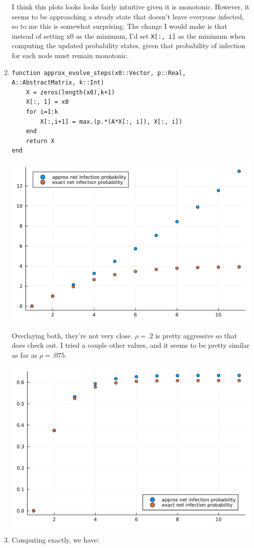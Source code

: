 \documentclass[]{exam}
\begin{document}
\begin{questions}
\begin{enumerate}[label=\arabic*.]
		I think this plots looks looks fairly intuitive given it is monotonic. However, it seems to be approaching a steady state that doesn't leave everyone infected, so to me this is somewhat surprising. The change I would make is that instead of setting x0 as the minimum, I'd set \texttt{X[:, i]} as the minimum when computing the updated probability states, given that probability of infection for each node must remain monotonic.
	\item
		\begin{lstlisting}
function approx_evolve_steps(x0::Vector, p::Real, A::AbstractMatrix, k::Int)
	X = zeros(length(x0),k+1)
	X[:, 1] = x0
	for i=1:k
		X[:,i+1] = max.(p.*(A*X[:, i]), X[:, i])
	end
	return X
end
		\end{lstlisting}
		\begin{center}
			\includegraphics[width=.7\textwidth]{code/q5-p5.png}
		\end{center}
		Overlaying both, they're not very close. $\rho = .2$ is pretty aggressive so that does check out.
		I tried a couple other values, and it seems to be pretty similar as far as $\rho = .075$. \\
		\begin{center}
			\includegraphics[width=.7\textwidth]{code/q5-p5b.png}
		\end{center}
	\item Computing exactly, we have:

\end{enumerate}
\end{questions}
\end{document}
